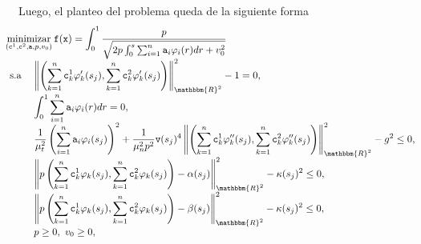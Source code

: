 \documentclass[10pt,mathserif]{beamer}
\newcommand{\R}{\mathbbm{R}}
\begin{document}
\begin{frame}
\begin{footnotesize}
Luego, el planteo del problema queda de la siguiente forma
\begin{equation*}
\begin{array}{ll}
&\hspace{-1cm}\displaystyle \mathop{\mathrm{minimizar}}_{(\texttt{c}^1,\texttt{c}^2,\texttt{a},p,v_0)}  \texttt{f}(\texttt{x})=\int_0^1\frac{p}{\sqrt{2p\int_0^s \sum_{i=1}^n\texttt{a}_i\varphi_i(r)dr +v_0^2}}\\
\hspace{-0.5cm} \mathrm{s.a} &\displaystyle \left\|\left(\sum_{k=1}^n\texttt{c}^1_k\varphi'_k(s_j), \sum_{k=1}^n\texttt{c}^2_k\varphi'_k(s_j)\right)\right\|_{\R^2}^2-1=0,\\[2mm]
                     &\displaystyle \int_{0}^{1} \sum_{i=1}^n\texttt{a}_i\varphi_i(r)dr=0,\\[2mm]
                     &\displaystyle \frac{1}{\mu_t^2} \left(\sum_{i=1}^n\texttt{a}_i\varphi_i(s_j)\right)^2 + \frac{1}{\mu_n^2 p^2}\texttt{v}(s_j)^4\left\| \left(\sum_{k=1}^n\texttt{c}^1_k\varphi_k''(s_j), \sum_{k=1}^n\texttt{c}^2_k\varphi_k''(s_j)\right) \right\|_{\R^2}^2-g^2\leq 0,\,\\[2mm]
                     &\displaystyle  \left\|p\left(\sum_{k=1}^n\texttt{c}^1_k\varphi_k(s_j), \sum_{k=1}^n\texttt{c}^2_k\varphi_k(s_j)\right)-\alpha(s_j)\right\|_{\R^2}^2-\kappa(s_j)^2 \leq 0,\, \\[2mm]
                     &\displaystyle  \left\|p\left(\sum_{k=1}^n\texttt{c}^1_k\varphi_k(s_j), \sum_{k=1}^n\texttt{c}^2_k\varphi_k(s_j)\right)-\beta(s_j)\right\|_{\R^2}^2-\kappa(s_j)^2 \leq 0, \,\\[2mm]
                     & p\geq 0,\ v_0\geq 0,

  \end{array}
\end{equation*}
\end{footnotesize}
\end{frame}
\end{document}
